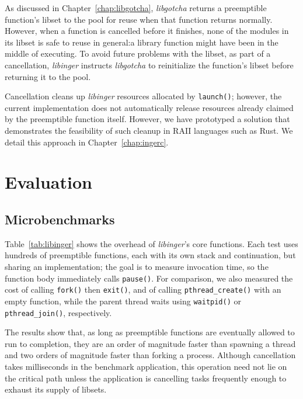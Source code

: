 As discussed in Chapter~\ref{chap:libgotcha}, \textit{libgotcha} returns a
preemptible function's libset to the pool for reuse when that function returns
normally.  However, when a function is cancelled before it finishes, none of the
modules in its libset is safe to reuse in general:\@ a library function might have
been in the middle of executing.  To avoid future problems with the libset, as part
of a cancellation, \textit{libinger} instructs \textit{libgotcha} to reinitialize the
function's libset before returning it to the pool.

Cancellation cleans up \textit{libinger} resources allocated by \texttt{launch()};
however, the current implementation does not automatically release resources already
claimed by the preemptible function itself.  However, we have prototyped a solution
that demonstrates the feasibility of such cleanup in RAII languages such as Rust.
We detail this approach in Chapter~\ref{chap:ingerc}.


\section{Evaluation}




\subsection{Microbenchmarks}
\label{sec:libinger:ueval}

Table~\ref{tab:libinger} shows the overhead of \textit{libinger}'s core functions.
Each test uses hundreds of preemptible functions, each with its own stack and
continuation, but sharing an implementation; the goal is to measure invocation time,
so the function body immediately calls \texttt{pause()}.
For comparison, we also measured the cost of calling \texttt{fork()} then
\texttt{exit()}, and of calling \texttt{pthread\_create()} with an empty function,
while the parent
thread waits using \texttt{waitpid()} or \texttt{pthread\_join()}, respectively.

The results show that, as long as preemptible functions are eventually allowed to run
to completion, they are an order of magnitude faster than spawning a thread and two
orders of magnitude faster than forking a process.  Although cancellation takes
milliseconds in the benchmark application, this operation need not lie on the
critical path unless the application is cancelling tasks frequently enough to exhaust
its supply of libsets.

